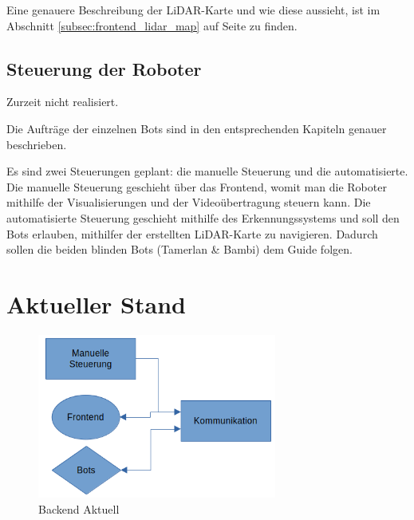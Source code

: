 Eine genauere Beschreibung der LiDAR-Karte und wie diese aussieht, 
ist im Abschnitt \ref{subsec:frontend_lidar_map} 
auf Seite \pageref{subsec:frontend_lidar_map} zu finden.

\subsection{Steuerung der Roboter}
\label{subsec:backend_robot_detection}
Zurzeit nicht realisiert.

Die Aufträge der einzelnen Bots 
sind in den entsprechenden Kapiteln genauer beschrieben.

Es sind zwei Steuerungen geplant:
die manuelle Steuerung und die automatisierte.
% 
Die manuelle Steuerung geschieht über das Frontend, 
womit man die Roboter mithilfe der Visualisierungen 
und der Videoübertragung steuern kann.
% 
Die automatisierte Steuerung geschieht mithilfe des Erkennungssystems 
und soll den Bots erlauben,
mithilfer der erstellten LiDAR-Karte zu navigieren. 
Dadurch sollen die beiden blinden Bots (Tamerlan \& Bambi) dem Guide folgen.

\section{Aktueller Stand}
\label{subsec:backend_aktueller_stand}

\begin{figure}[H]
    \includegraphics[width=0.7\textwidth, center]{img/Backend/backend-aktuell.png}
    \caption{Backend Aktuell}
    \label{fig:backend_konzept}
\end{figure}

